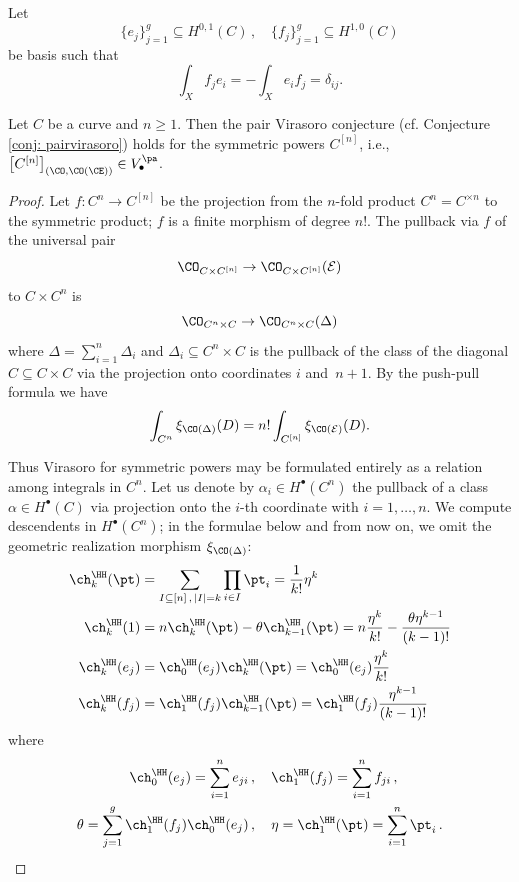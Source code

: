 Let
\[\{e_j\}_{j=1}^g\subseteq H^{0,1}(C)\,,\quad \{f_j\}_{j=1}^g\subseteq H^{1,0}(C)\]
be basis such that
\[\int_X f_je_i=-\int_X e_if_j=\delta_{ij}.\]
\begin{proposition}
\notready
\label{prop: symmetricpowers}
Let $C$ be a curve and $n\geq 1$. Then the pair Virasoro conjecture (cf. Conjecture \ref{conj: pairvirasoro}) holds for the symmetric powers $C^{[n]}$, i.e., $\big[C^{[n]}\big]_{(\CO, \CO(\CE))}\in V_\bullet^{\pa}$.
\end{proposition}


\begin{proof}

Let $f\colon C^{n}\to C^{[n]}$ be the projection from the $n$-fold product $C^n=C^{\times n}$ to the symmetric product; $f$ is a finite morphism of degree $n!$. The pullback via $f$ of the universal pair \[\CO_{C\times C^{[n]}}\to \CO_{C\times C^{[n]}}(\mathcal E)\]
to $C\times C^n$ is
\[\CO_{C^{n}\times C}\to \CO_{C^{n}\times C}( \Delta)\]
where $\Delta=\sum_{i=1}^n \Delta_i$ and $\Delta_i\subseteq C^n \times C$ is the pullback of the class of the diagonal $C\subseteq C\times C$ via the projection onto coordinates $i$ and~$n+1$. By the push-pull formula we have
\[\int_{C^n} \xi_{\CO(\Delta)}(D)=n!\int_{C^{[n]}}\xi_{\CO(\mathcal E)}(D).\]

Thus Virasoro for symmetric powers may be formulated entirely as a relation among integrals in $C^n$. Let us denote by $\alpha_i\in H^\bullet(C^n)$ the pullback of a class $\alpha\in H^\bullet(C)$ via projection onto the $i$-th coordinate with $i=1,\ldots, n$. We compute descendents in $H^\bullet(C^n)$; in the formulae below and from now on, we omit the geometric realization morphism $\xi_{\CO(\Delta)}$:
\begin{align*}
\ch_k^\HH(\pt)&=\sum_{I\subseteq [n]\,, \,|I|=k}\prod_{i\in I}\pt_i=\frac{1}{k!}\eta^k\\
\ch_k^\HH(1)&=n\ch_k^\HH(\pt)-\theta \ch_{k-1}^\HH(\pt)=n\frac{ \eta^k}{k!}-\frac{\theta\eta^{k-1}}{(k-1)!}\\
\ch_k^\HH(e_j)&=\ch_0^\HH(e_j)\ch_k^\HH(\pt)=\ch_0^\HH(e_j)\frac{\eta^k}{k!}\\
\ch_k^\HH(f_j)&=\ch_1^\HH(f_j)\ch_{k-1}^\HH(\pt)=\ch_1^\HH(f_j)\frac{\eta^{k-1}}{(k-1)!}
\end{align*}
where
\begin{align*}
    \ch_0^\HH(e_j)=\sum_{i=1}^n e_{ji}\,&, \quad
    \ch_1^\HH(f_j)=\sum_{i=1}^n f_{ji}\, , \\
   \theta=\sum_{j=1}^g\ch_1^\HH(f_j)\ch_0^\HH(e_j)\, &, \quad\eta=\ch_1^\HH(\pt)=\sum_{i=1}^n \pt_i\,.
\end{align*}


\end{proof}
